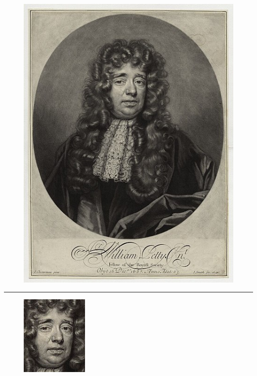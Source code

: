 \documentclass[
  letterpaper,
  DIV=11,
  numbers=noendperiod]{scrartcl}
\begin{document}
\begin{figure}

\hfill{} \includegraphics{images/sir_will.png}

\end{figure}

\begin{center}\rule{0.5\linewidth}{0.5pt}\end{center}

\begin{figure}

{\centering \includegraphics{images/close_will.png}

}

\end{figure}
\end{document}
